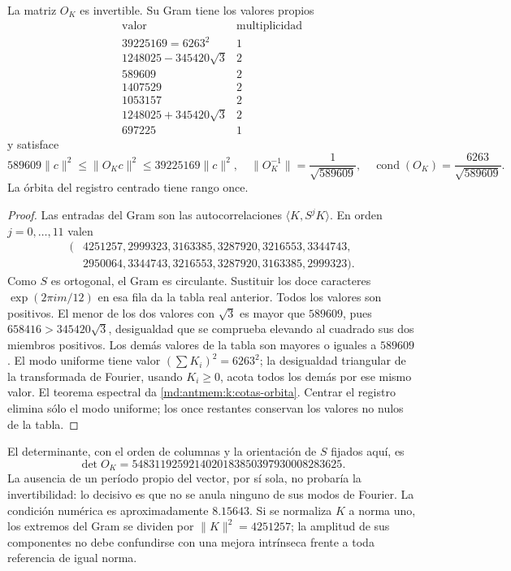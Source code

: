 \begin{theorem}
\label{md:antmem:k:marco-ciclico}
La matriz \(O_K\) es invertible. Su Gram tiene los valores propios
\[
\begin{array}{c|c}
 \text{valor}&\text{multiplicidad}\\\hline
 39225169=6263^2&1\\
 1248025-345420\sqrt3&2\\
 589609&2\\
 1407529&2\\
 1053157&2\\
 1248025+345420\sqrt3&2\\
 697225&1
\end{array}
\]
y satisface
\begin{equation}
 589609\|c\|^2\leq\|O_Kc\|^2\leq39225169\|c\|^2,
 \quad
 \|O_K^{-1}\|=\frac1{\sqrt{589609}},\quad
 \operatorname{cond}(O_K)=\frac{6263}{\sqrt{589609}}.
 \label{md:antmem:k:cotas-orbita}
\end{equation}
La órbita del registro centrado tiene rango once.
\end{theorem}
\begin{proof}
Las entradas del Gram son las autocorrelaciones
\(\langle K,S^jK\rangle\). En orden \(j=0,\ldots,11\) valen
\begin{align*}
 (&4251257,2999323,3163385,3287920,3216553,3344743,\\
  &2950064,3344743,3216553,3287920,3163385,2999323).
\end{align*}
Como \(S\) es ortogonal, el Gram es circulante. Sustituir los doce
caracteres \(\exp(2\pi i m/12)\) en esa fila da la tabla real
anterior. Todos los valores son positivos. El menor de los dos valores
con \(\sqrt3\) es mayor que \(589609\), pues
\(658416>345420\sqrt3\), desigualdad que se comprueba elevando al
cuadrado sus dos miembros positivos. Los demás valores de la tabla son
mayores o iguales a \(589609\). El modo uniforme tiene valor
\((\sum K_i)^2=6263^2\); la desigualdad triangular de la transformada
de Fourier, usando \(K_i\geq0\), acota todos los demás por ese mismo
valor. El teorema espectral da \eqref{md:antmem:k:cotas-orbita}. Centrar
el registro elimina sólo el modo uniforme; los once restantes conservan
los valores no nulos de la tabla.
\end{proof}

El determinante, con el orden de columnas y la orientación de \(S\)
fijados aquí, es
\[
 \det O_K=5483119259214020183850397930008283625.
\]
La ausencia de un período propio del vector, por sí sola, no probaría la
invertibilidad: lo decisivo es que no se anula ninguno de sus modos de
Fourier. La condición numérica es aproximadamente \(8.15643\). Si se
normaliza \(K\) a norma uno, los extremos del Gram se dividen por
\(\|K\|^2=4251257\); la amplitud de sus componentes no debe
confundirse con una mejora intrínseca frente a toda referencia de igual
norma.

